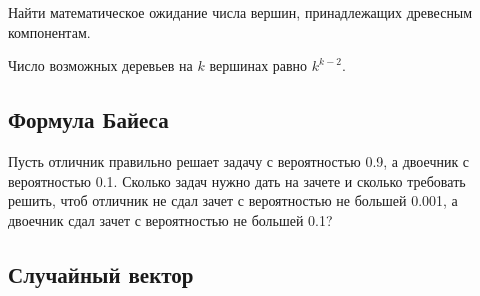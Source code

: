 \begin{problem}
Найти математическое ожидание числа вершин, принадлежащих древесным компонентам.
\begin{ordre}
Число возможных деревьев на $k$ вершинах равно $k^{k-2}$. 
\end{ordre}
\end{problem}


\subsection{Формула Байеса}

\begin{problem}
Пусть отличник правильно решает задачу с вероятностью 0.9, а двоечник с вероятностью 0.1. Сколько задач нужно дать на зачете и сколько требовать решить, чтоб отличник не сдал зачет с вероятностью не большей 0.001, а двоечник сдал зачет с вероятностью не большей 0.1?
\end{problem}



\subsection{Случайный вектор}

